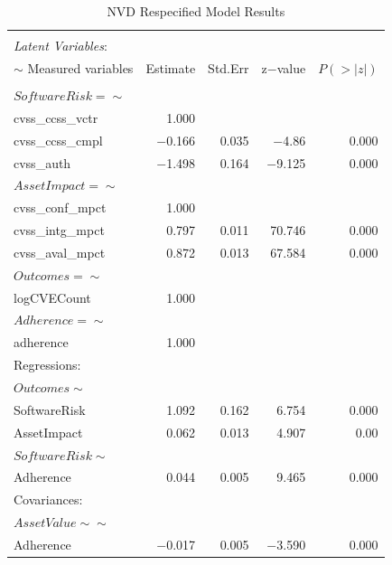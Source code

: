 \begin{table}
	\begin{center}	
		\caption{NVD Respecified Model Results}
		\label{tab:results_nvd}
		\begin{tabular}{l|rrrr}
				\\[-1.8ex]\hline 
				\hline \\[-1.8ex] 
			\textit{Latent Variables}:  & & & & \\  
			$\sim$ Measured variables& Estimate & Std.Err & z$-$value & $P(>|z|)$ \\
				\hline \\[-1.8ex]
			$SoftwareRisk =\sim$  & & & & \\                                   
			cvss\_ccss\_vctr   & 1.000 & &  & \\                             
			cvss\_ccss\_cmpl &  $-$0.166 &   0.035 &  $-$4.86 &   0.000\\
			cvss\_auth     &   $-$1.498  &  0.164  & $-$9.125   & 0.000\\
			$AssetImpact =\sim$     & & & & \\                                    
			cvss\_conf\_mpct   & 1.000     & & & \\                       
			cvss\_intg\_mpct   & 0.797   & 0.011 & 70.746 &   0.000 \\
			cvss\_aval\_mpct  &  0.872   & 0.013 & 67.584   & 0.000 \\
			$Outcomes =\sim$    & & & & \\                                     
			logCVECount     &  1.000  & & & \\                          
			$Adherence =\sim$   & & & & \\                                      
			adherence    &     1.000        & & & \\                    
			Regressions:  & & & & \\  
			$Outcomes \sim$         & & & & \\                                     
			SoftwareRisk   &  1.092 &   0.162 & 6.754 &   0.000 \\
			AssetImpact     &   0.062  &  0.013  &  4.907 &   0.00\\
			$SoftwareRisk \sim$        & & & & \\                                  
			Adherence     &    0.044 &   0.005  &  9.465 &   0.000\\
			Covariances:  & & & & \\  
			$AssetValue \sim\sim$          & & & & \\                                 
			Adherence      &  $-$0.017  &  0.005 &  $-$3.590 &   0.000\\
		\end{tabular}
	\end{center}
\end{table} 

